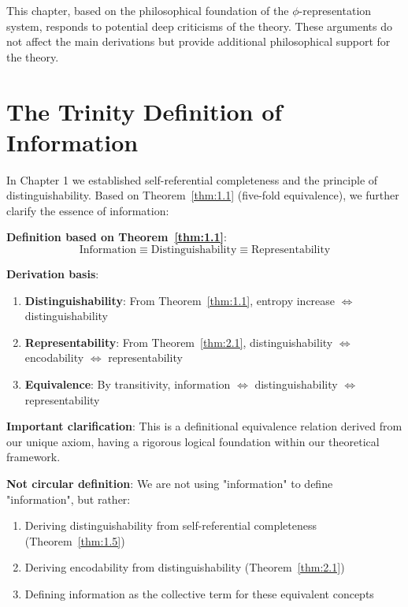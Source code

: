 
This chapter, based on the philosophical foundation of the $\phi$-representation system, responds to potential deep criticisms of the theory. These arguments do not affect the main derivations but provide additional philosophical support for the theory.

\section{The Trinity Definition of Information}
\label{sec:ch07_defense:the-trinity-definition-of-information}

In Chapter 1 we established self-referential completeness and the principle of distinguishability. Based on Theorem~\ref{thm:1.1} (five-fold equivalence), we further clarify the essence of information:

\textbf{Definition based on Theorem~\ref{thm:1.1}}:
\begin{equation}
\boxed{\text{Information} \equiv \text{Distinguishability} \equiv \text{Representability}}
\end{equation}

\textbf{Derivation basis}:
\begin{enumerate}
\item \textbf{Distinguishability}: From Theorem~\ref{thm:1.1}, entropy increase $\Leftrightarrow$ distinguishability
\item \textbf{Representability}: From Theorem~\ref{thm:2.1}, distinguishability $\Leftrightarrow$ encodability $\Leftrightarrow$ representability
\item \textbf{Equivalence}: By transitivity, information $\Leftrightarrow$ distinguishability $\Leftrightarrow$ representability
\end{enumerate}

\textbf{Important clarification}: This is a definitional equivalence relation derived from our unique axiom, having a rigorous logical foundation within our theoretical framework.

\textbf{Not circular definition}: We are not using "information" to define "information", but rather:
\begin{enumerate}
\item Deriving distinguishability from self-referential completeness (Theorem~\ref{thm:1.5})
\item Deriving encodability from distinguishability (Theorem~\ref{thm:2.1})
\item Defining information as the collective term for these equivalent concepts
\end{enumerate}

